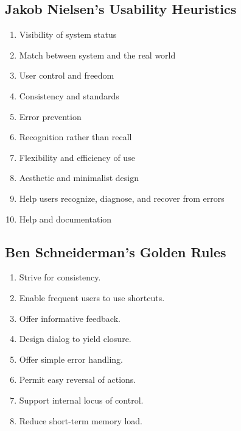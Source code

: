 \subsection{Jakob Nielsen's Usability Heuristics}
\begin{enumerate}
    \item Visibility of system status
    \item Match between system and the real world
    \item User control and freedom
    \item Consistency and standards
    \item Error prevention
    \item Recognition rather than recall
    \item Flexibility and efficiency of use
    \item Aesthetic and minimalist design
    \item Help users recognize, diagnose, and recover from errors
    \item Help and documentation
\end{enumerate}

\subsection{Ben Schneiderman's Golden Rules}
\begin{enumerate}
    \item Strive for consistency.
    \item Enable frequent users to use shortcuts.
    \item Offer informative feedback.
    \item Design dialog to yield closure.
    \item Offer simple error handling.
    \item Permit easy reversal of actions.
    \item Support internal locus of control.
    \item Reduce short-term memory load.
\end{enumerate}


